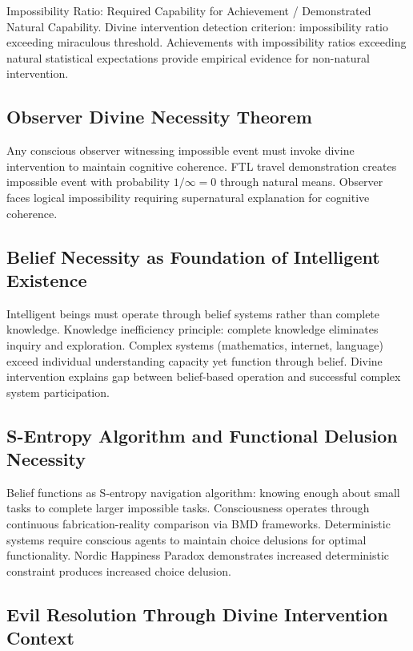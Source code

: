 \documentclass[12pt,a4paper]{article}
\begin{document}
Impossibility Ratio: Required Capability for Achievement / Demonstrated Natural Capability. Divine intervention detection criterion: impossibility ratio exceeding miraculous threshold. Achievements with impossibility ratios exceeding natural statistical expectations provide empirical evidence for non-natural intervention.

\subsection{Observer Divine Necessity Theorem}

Any conscious observer witnessing impossible event must invoke divine intervention to maintain cognitive coherence. FTL travel demonstration creates impossible event with probability $1/\infty = 0$ through natural means. Observer faces logical impossibility requiring supernatural explanation for cognitive coherence.

\subsection{Belief Necessity as Foundation of Intelligent Existence}

Intelligent beings must operate through belief systems rather than complete knowledge. Knowledge inefficiency principle: complete knowledge eliminates inquiry and exploration. Complex systems (mathematics, internet, language) exceed individual understanding capacity yet function through belief. Divine intervention explains gap between belief-based operation and successful complex system participation.

\subsection{S-Entropy Algorithm and Functional Delusion Necessity}

Belief functions as S-entropy navigation algorithm: knowing enough about small tasks to complete larger impossible tasks. Consciousness operates through continuous fabrication-reality comparison via BMD frameworks. Deterministic systems require conscious agents to maintain choice delusions for optimal functionality. Nordic Happiness Paradox demonstrates increased deterministic constraint produces increased choice delusion.

\subsection{Evil Resolution Through Divine Intervention Context}
\end{document}
